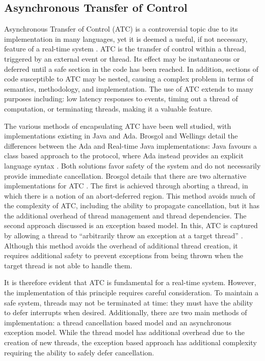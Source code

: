 \subsection{Asynchronous Transfer of Control}
Asynchronous Transfer of Control (ATC) is a controversial topic due to
its implementation in many languages, yet it is deemed a useful, if not
necessary, feature of a real-time system \cite{atc-article}.  ATC is the
transfer of control within a thread, triggered by an external
event or thread.  Its effect may be instantaneous or deferred until a safe
section in the code has been reached. In addition, sections of code susceptible
to ATC may be nested, causing a complex problem in terms of semantics,
methodology, and implementation. The use of ATC extends to many
purposes including: low latency responses to events, timing out a thread of
computation, or terminating threads, making it a valuable feature. 
\par\bigskip\noindent
The various methods of encapsulating ATC have been well studied, with 
implementations existing in Java
and Ada. Brosgol and Wellings detail the differences between the Ada and
Real-time Java implementations: Java favours a class based approach to
the protocol, where Ada instead provides an explicit language syntax
\cite{atc-article}. Both solutions favor safety of the system and do not
necessarily provide immediate cancellation. Brosgol 
details that there are two alternative implementations for
ATC \cite{Brosgol:2002:ATC}.
The first is achieved through aborting a thread, in which there is a notion of
an abort-deferred region. 
This method avoids much of the complexity of ATC, including the ability to
propagate cancellation, but it has the additional overhead of thread management and
thread dependencies.  
The second approach discussed is an exception based model. 
In this, ATC is captured by allowing a thread to ``arbitrarily throw an
exception at a target thread'' \cite{Brosgol:2002:ATC}.  
Although this method avoids the overhead of additional
thread creation, it requires additional safety to prevent exceptions
from being thrown when the target thread is not able to handle them.
\par\bigskip\noindent
It is therefore evident that ATC
is fundamental for a real-time system. However, the implementation of 
this principle requires careful consideration. 
To maintain a safe system, threads may not be terminated at time: they must have 
the ability to defer interrupts when desired. 
Additionally, there are two main methods of
implementation: a thread cancellation based model and an asynchronous
exception model. While the thread model has additional overhead due to the
creation of new threads, the exception based approach has additional complexity
requiring the ability to safely defer cancellation.

